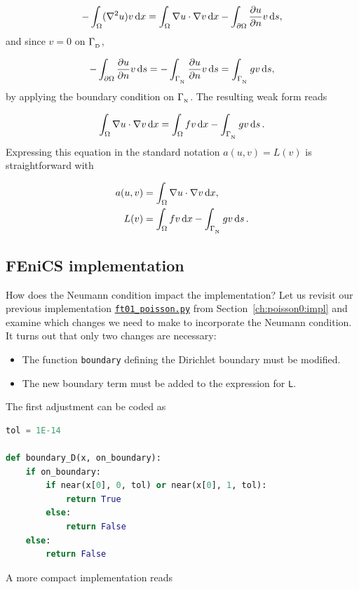 \documentclass[graybox,envcountchap,sectrefs,final]{svmonodo}
\begin{document}
\begin{equation*}
 -\int_\Omega (\nabla^2 u)v \dx
= \int_\Omega\nabla u\cdot\nabla v \dx - \int_{\partial\Omega}{\partial u\over
\partial n}v \ds,
\end{equation*}
and since $v=0$ on $\GD$,

\begin{equation*}
- \int_{\partial\Omega}{\partial u\over
\partial n}v \ds
=
- \int_{\GN}{\partial u\over
\partial n}v \ds
= \int_{\GN}gv \ds,
\end{equation*}
by applying the boundary condition on $\GN$.
The resulting weak form reads

\begin{equation}
\int_{\Omega} \nabla u \cdot \nabla v \dx
= \int_{\Omega} fv \dx - \int_{\GN} gv \ds\tp
\label{ch:poisson0:2D:DN:weak}
\end{equation}
Expressing this equation
in the standard notation $a(u,v)=L(v)$ is straightforward with

\begin{align}
a(u, v) &= \int_{\Omega} \nabla u \cdot \nabla v \dx,
\label{ftut:poisson2:vard:a}\\
L(v) &= \int_{\Omega} fv \dx -
\int_{\GN} gv \ds\tp  \label{ftut:poisson2:vard:L}
\end{align}

\subsection{FEniCS implementation}

How does the Neumann condition impact the implementation?  Let us
revisit our previous implementation
\href{{https://fenicsproject.org/pub/tutorial/python/vol1/ft01_poisson.py}}{\nolinkurl{ft01_poisson.py}}
from Section~\ref{ch:poisson0:impl} and examine which changes
we need to make to incorporate the Neumann condition. It turns out
that only two changes are necessary:

\begin{itemize}
  \item The function \texttt{boundary} defining the Dirichlet boundary
    must be modified.

  \item The new boundary term must be added to the expression for \texttt{L}.
\end{itemize}

\noindent
The first adjustment can be coded as

\begin{lstlisting}[language=Python,style=graycolor]
tol = 1E-14

def boundary_D(x, on_boundary):
    if on_boundary:
        if near(x[0], 0, tol) or near(x[0], 1, tol):
            return True
        else:
            return False
    else:
        return False
\end{lstlisting}
A more compact implementation reads
\end{document}
